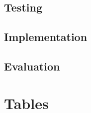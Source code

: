 \documentclass[11pt]{article}
\begin{document}
                
            
        \subsection{Testing}
        \subsection{Implementation}
        \subsection{Evaluation}


    \newpage
    \appendix

    \section{Tables}
\end{document}
